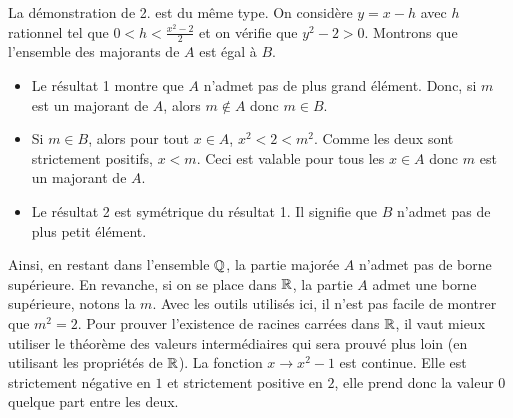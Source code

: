 La démonstration de 2. est du même type. On considère $y=x-h$ avec $h$ rationnel tel que $0<h<\frac{x^2-2}{2}$ et on vérifie que $y^2-2 > 0$.\newline
Montrons que l'ensemble des majorants de $A$ est égal à $B$.
\begin{itemize}
 \item Le résultat 1 montre que $A$ n'admet pas de plus grand élément. Donc, si $m$ est un majorant de $A$, alors $m\notin A$ donc $m\in B$.
\item Si $m\in B$, alors pour tout $x\in A$, $x^2 < 2 < m^2$. Comme les deux sont strictement positifs, $x<m$. Ceci est valable pour tous les $x\in A$ donc $m$ est un majorant de $A$.
\item Le résultat 2 est symétrique du résultat 1. Il signifie que $B$ n'admet pas de plus petit élément.
\end{itemize}
Ainsi, en restant dans l'ensemble $\mathbb{Q}$, la partie majorée $A$ n'admet pas de borne supérieure.\newline
En revanche, si on se place dans $\mathbb{R}$, la partie $A$ admet une borne supérieure, notons la $m$. Avec les outils utilisés ici, il n'est pas facile de montrer que $m^2=2$. Pour prouver l'existence de racines carrées dans $\mathbb{R}$, il vaut mieux utiliser le théorème des valeurs intermédiaires qui sera prouvé plus loin (en utilisant les propriétés de $\mathbb{R}$). La fonction $x\rightarrow x^2 - 1$ est continue. Elle est strictement négative en $1$ et strictement positive en $2$, elle prend donc la valeur $0$ quelque part entre les deux.

